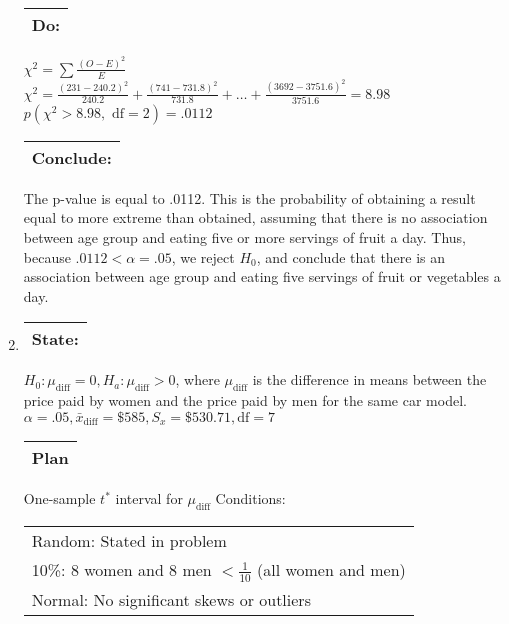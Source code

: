 \documentclass[12pt]{article}
\begin{document}
\begin{enumerate}
    \begin{tabular}{|c|}
    \hline
    \textbf{Do:}\\
    \hline
    \end{tabular}

    $\chi^2 = \sum \frac{(O-E)^2}{E}$\\
    $\chi^2 = \frac{(231 - 240.2)^2}{240.2} + \frac{(741-731.8)^2}{731.8} + \dots + \frac{(3692-3751.6)^2}{3751.6}=8.98$\\
    $p(\chi^2 > 8.98,\text{ df}=2)=.0112$\\

    \begin{tabular}{|c|}
    \hline
    \textbf{Conclude:}\\
    \hline
    \end{tabular}

    The p-value is equal to .0112. This is the probability of obtaining a result equal to more extreme than obtained, assuming that there is no association between age group and eating five or more servings of fruit a day. Thus, because $.0112 < \alpha = .05$, we reject $H_0$, and conclude that there is an association between age group and eating five servings of fruit or vegetables a day.

  \item 

    \begin{tabular}{|c|}
    \hline
    \textbf{State:}\\
    \hline
    \end{tabular}

    $H_0: \mu_{\text{diff}} = 0, H_a: \mu_{\text{diff}} > 0$, where $\mu_{\text{diff}}$ is the difference in means between the price paid by women and the price paid by men for the same car model.\\
    $\alpha=.05, \bar{x}_{\text{diff}} = \$585, S_x = \$530.71, \text{df}=7$

    \begin{tabular}{|c|}
    \hline
    \textbf{Plan}\\
    \hline
    \end{tabular}

    One-sample $t^*$ interval for $\mu_{\text{diff}}$
    Conditions: \begin{tabular}{l}Random: Stated in problem\\ 10\%: 8 women and 8 men $<\frac{1}{10}$ (all women and men)\\ Normal: No significant skews or outliers \end{tabular}


\end{enumerate}
\end{document}
